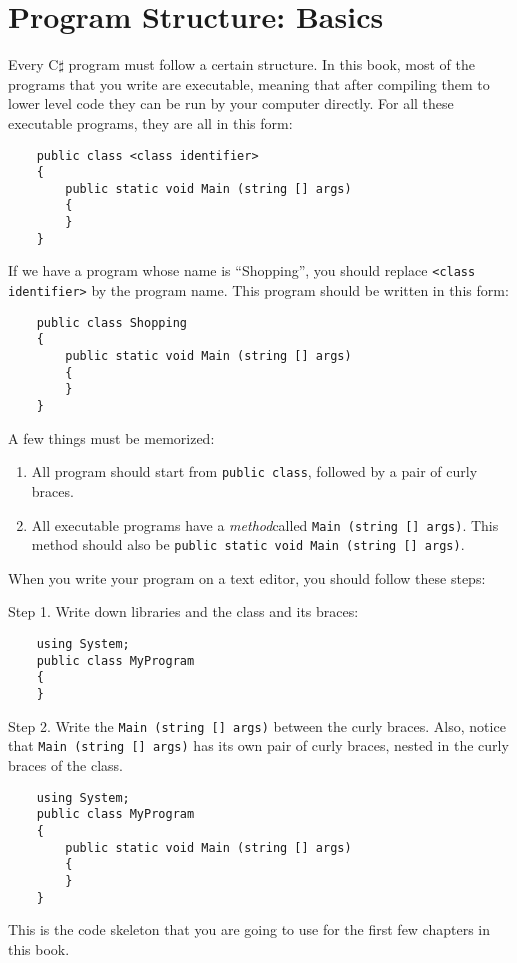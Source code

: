 \documentclass[../main.tex]{subfiles}
\begin{document}
    \section{Program Structure: Basics}
    Every C$\sharp$ program must follow a certain structure. In this book, most
    of the programs that you write are executable, meaning that after compiling
    them to lower level code they can be run by your computer directly. For all
    these executable programs, they are all in this form:

    \begin{verbatim}
    public class <class identifier>
    {
        public static void Main (string [] args)
        {
        }
    }
    \end{verbatim}

    If we have a program whose name is ``Shopping'', you should replace
    \texttt{<class identifier>} by the program name. This program should be written
    in this form:

    \begin{verbatim}
    public class Shopping
    {
        public static void Main (string [] args)
        {
        }
    }
    \end{verbatim}

    A few things must be memorized:
    \begin{enumerate}
        \item All program should start from \texttt{public class}, followed by a
        pair of curly braces.
        \item All executable programs have a \emph{method}called
        \texttt{Main (string [] args)}. This method should also be
        \texttt{public static void Main (string [] args)}.
    \end{enumerate}

    When you write your program on a text editor, you should follow these steps:

    Step 1. Write down libraries and the class and its braces:

    \begin{verbatim}
    using System;
    public class MyProgram
    {
    }
    \end{verbatim}

    Step 2. Write the \texttt{Main (string [] args)} between the curly braces. Also,
    notice that \texttt{Main (string [] args)} has its own pair of curly braces,
    nested in the curly braces of the class.

    \begin{verbatim}
    using System;
    public class MyProgram
    {
        public static void Main (string [] args)
        {
        }
    }
    \end{verbatim}
    This is the code skeleton that you are going to use for the first few
    chapters in this book.
\end{document}
